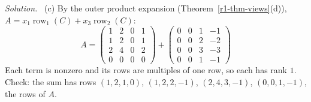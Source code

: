 \documentclass[12pt]{article}
\DeclareMathOperator{\row}{row}
\theoremstyle{definition}
\newenvironment{solution}{\par\noindent\textit{Solution.}\ }{\par\smallskip}
\begin{document}
\begin{solution}
(c) By the outer product expansion (Theorem~\ref{r1-thm-views}(d)), \(A=x_1\row_1(C)+x_3\row_2(C)\):
\[
A=\begin{pmatrix}1&2&0&1\\1&2&0&1\\2&4&0&2\\0&0&0&0\end{pmatrix}+\begin{pmatrix}0&0&1&-1\\0&0&2&-2\\0&0&3&-3\\0&0&1&-1\end{pmatrix}
\]
Each term is nonzero and its rows are multiples of one row, so each has rank \(1\). Check: the sum has rows
\((1,2,1,0)\), \((1,2,2,-1)\), \((2,4,3,-1)\), \((0,0,1,-1)\), the rows of \(A\).
\end{solution}
\end{document}
